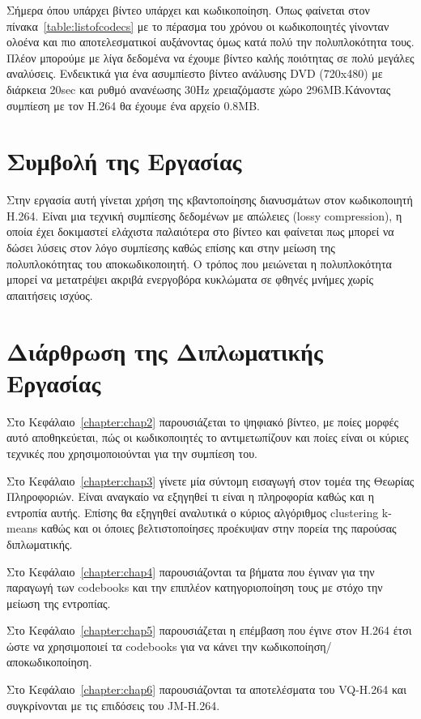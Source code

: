 \indent
Σήμερα όπου υπάρχει βίντεο υπάρχει και κωδικοποίηση. Όπως φαίνεται στον πίνακα~\ref{table:listofcodecs} με το πέρασμα του χρόνου οι κωδικοποιητές γίνονταν ολοένα και πιο αποτελεσματικοί αυξάνοντας όμως κατά πολύ την πολυπλοκότητα τους. Πλέον μπορούμε με λίγα δεδομένα να έχουμε βίντεο καλής ποιότητας σε πολύ μεγάλες αναλύσεις. Ενδεικτικά για ένα ασυμπίεστο βίντεο ανάλυσης DVD (720x480) με διάρκεια 20sec και ρυθμό ανανέωσης \si{30}{Hz} χρειαζόμαστε χώρο 296ΜΒ.Κάνοντας συμπίεση με τον H.264 θα έχουμε ένα αρχείο 0.8ΜΒ.

\section{Συμβολή της Εργασίας}
\label{section:sect12}
\indent
Στην εργασία αυτή γίνεται χρήση της κβαντοποίησης διανυσμάτων στον κωδικοποιητή H.264. Είναι μια τεχνική συμπίεσης δεδομένων με απώλειες (lossy compression), η οποία έχει δοκιμαστεί ελάχιστα παλαιότερα στο βίντεο και φαίνεται πως μπορεί να δώσει λύσεις στον λόγο συμπίεσης καθώς επίσης και στην μείωση της πολυπλοκότητας του αποκωδικοποιητή. Ο τρόπος που μειώνεται η πολυπλοκότητα μπορεί να μετατρέψει ακριβά ενεργοβόρα κυκλώματα σε φθηνές μνήμες χωρίς απαιτήσεις ισχύος.

\section{Διάρθρωση της Διπλωματικής Εργασίας}
\label{section:sect13}

\indent
Στο Κεφάλαιο~\ref{chapter:chap2} παρουσιάζεται το ψηφιακό βίντεο, με ποίες μορφές αυτό αποθηκεύεται, πώς οι κωδικοποιητές το αντιμετωπίζουν και ποίες είναι οι κύριες τεχνικές που χρησιμοποιούνται για την συμπίεση του.\newline \indent

Στο Κεφάλαιο~\ref{chapter:chap3} γίνετε μία σύντομη εισαγωγή στον τομέα της Θεωρίας Πληροφοριών. Είναι αναγκαίο να εξηγηθεί τι είναι η πληροφορία καθώς και η εντροπία αυτής. Επίσης θα εξηγηθεί αναλυτικά ο κύριος αλγόριθμος clustering k-means καθώς και οι όποιες βελτιστοποίησες προέκυψαν στην πορεία της παρούσας διπλωματικής.\newline \indent

Στο Κεφάλαιο~\ref{chapter:chap4} παρουσιάζονται τα βήματα που έγιναν για την παραγωγή των codebooks και την επιπλέον κατηγοριοποίηση τους με στόχο την μείωση της εντροπίας.\newline \indent

Στο Κεφάλαιο~\ref{chapter:chap5} παρουσιάζεται η επέμβαση που έγινε στον H.264 έτσι ώστε να χρησιμοποιεί τα codebooks για να κάνει την κωδικοποίηση/αποκωδικοποίηση.\newline \indent

Στο Κεφάλαιο~\ref{chapter:chap6} παρουσιάζονται τα αποτελέσματα του VQ-H.264 και συγκρίνονται με τις επιδόσεις του JM-H.264. 